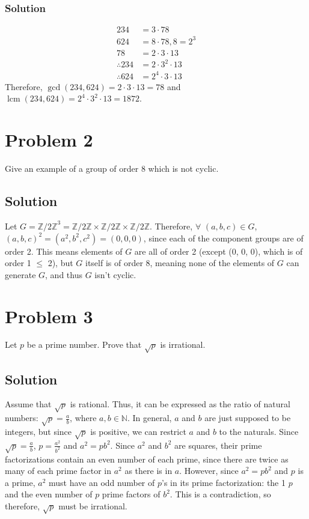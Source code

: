 \documentclass[fleqn]{article}
\DeclareMathOperator{\lcm}{lcm}
\begin{document}
            \subsubsection{Solution}
            \begin{align}
                234 &= 3 \cdot 78 \\
                624 &= 8 \cdot 78, 8 = 2^3 \\
                78 &= 2 \cdot 3 \cdot 13 \\
                \therefore 234 &= 2 \cdot 3^2 \cdot 13 \\
                \therefore 624 &= 2^4 \cdot 3 \cdot 13
            \end{align}
            Therefore, $\gcd(234, 624) = 2 \cdot 3 \cdot 13 = 78$ and $\lcm(234, 624) = 2^4 \cdot 3^2 \cdot 13 = 1872$.
        
    \section{Problem 2}
    Give an example of a group of order 8 which is not cyclic.
        
        \subsection{Solution}
        Let $G = {\mathbb{Z}/2\mathbb{Z}}^3 = \mathbb{Z}/2\mathbb{Z} \times \mathbb{Z}/2\mathbb{Z} \times \mathbb{Z}/2\mathbb{Z}$.  Therefore, $\forall$ $(a, b, c) \in G$, $(a, b, c)^2 = (a^2, b^2, c^2) = (0, 0, 0)$, since each of the component groups are of order 2.  This means elements of $G$ are all of order 2 (except (0, 0, 0), which is of order 1 $\leq$ 2), but $G$ itself is of order 8, meaning none of the elements of $G$ can generate $G$, and thus $G$ isn't cyclic.
        
    \section{Problem 3}
    Let $p$ be a prime number.  Prove that $\sqrt{p}$ is irrational.
        
        \subsection{Solution}
        Assume that $\sqrt{p}$ is rational.  Thus, it can be expressed as the ratio of natural numbers: $\sqrt{p} = \frac{a}{b}$, where $a, b \in \mathbb{N}$.  In general, $a$ and $b$ are just supposed to be integers, but since $\sqrt{p}$ is positive, we can restrict $a$ and $b$ to the naturals.  Since $\sqrt{p} = \frac{a}{b}$, $p = \frac{a^2}{b^2}$ and $a^2 = p b^2$.  Since $a^2$ and $b^2$ are squares, their prime factorizations contain an even number of each prime, since there are twice as many of each prime factor in $a^2$ as there is in $a$.  However, since $a^2 = p b^2$ and $p$ is a prime, $a^2$ must have an odd number of $p$'s in its prime factorization: the 1 $p$ and the even number of $p$ prime factors of $b^2$.  This is a contradiction, so therefore, $\sqrt{p}$ must be irrational.
        
\end{document}
